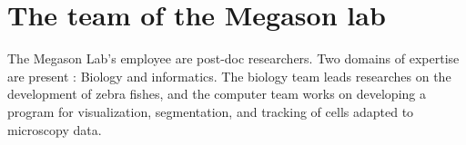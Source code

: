 




\chapter{The team of the Megason lab}

The Megason Lab's employee are post-doc researchers. Two domains of expertise are present : Biology and informatics.
The biology team leads researches on the development of zebra fishes,
and the computer team works on developing a program for visualization, segmentation, and tracking of cells adapted to microscopy data.

